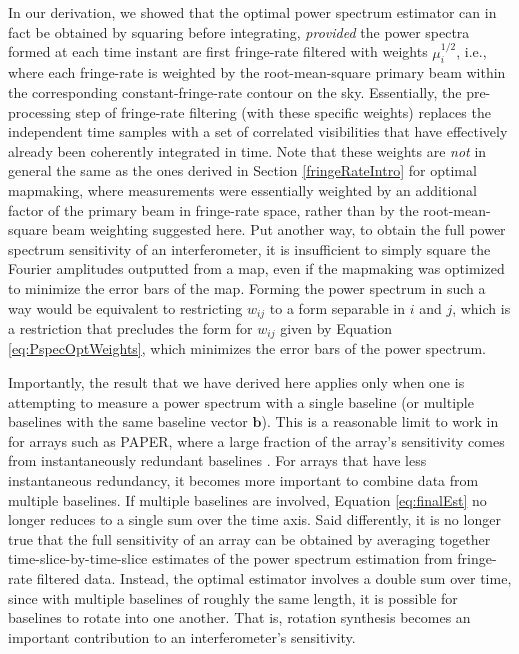 \documentclass[twocolumn,apj,numberedappendix]{emulateapj}
\begin{document}
In our derivation, we showed that the optimal power spectrum estimator can in fact be obtained by squaring before integrating, \emph{provided} the power spectra formed at each time instant are first fringe-rate filtered with weights $ \mu_i^{1/2}$, i.e., where each fringe-rate is weighted by the root-mean-square primary beam within the corresponding constant-fringe-rate contour on the sky. Essentially, the pre-processing step of fringe-rate filtering (with these specific weights) replaces the independent time samples with a set of correlated visibilities that have effectively already been coherently integrated in time. Note that these weights are \emph{not} in general the same as the ones derived in Section \ref{fringeRateIntro} for optimal mapmaking, where measurements were essentially weighted by an additional factor of the primary beam in fringe-rate space, rather than by the root-mean-square beam weighting suggested here. Put another way, to obtain the full power spectrum sensitivity of an interferometer, it is insufficient
to simply square the Fourier amplitudes outputted from a map, even if the mapmaking was optimized to minimize the error bars of the map.  Forming the power spectrum in such a way would be equivalent to restricting $w_{ij}$ to a form separable in $i$ and $j$, which is a restriction that precludes the form for $w_{ij}$ given by Equation \eqref{eq:PspecOptWeights}, which minimizes the error bars of the power spectrum.

Importantly, the result that we have derived here applies only when one is attempting to measure a power spectrum with a single baseline (or multiple baselines with the same baseline vector $\mathbf{b}$). This is a reasonable limit to work in for arrays such as PAPER, where a large fraction of the array's sensitivity comes from instantaneously redundant baselines \citep{parsons_et_al2012a}. For arrays that have less instantaneous redundancy, it becomes more important to combine data from multiple baselines. If multiple baselines are involved, Equation \eqref{eq:finalEst} no longer reduces to a single sum over the time axis. Said differently, it is no longer true that the full sensitivity of an array can be obtained by averaging together time-slice-by-time-slice estimates of the power spectrum estimation from fringe-rate filtered data. Instead, the optimal estimator involves a double sum over time, since with multiple baselines of roughly the same length, it is possible for baselines to rotate into one another. That is, rotation synthesis becomes an important contribution to an interferometer's sensitivity.
\end{document}
